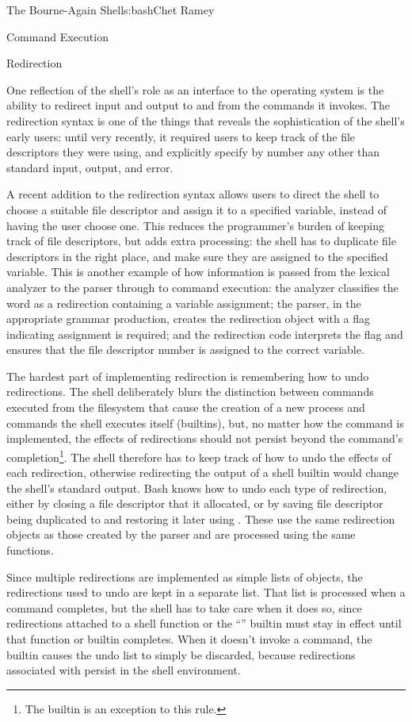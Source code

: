 \begin{aosachapter}{The Bourne-Again Shell}{s:bash}{Chet Ramey}
\begin{aosasect1}{Command Execution}
\begin{aosasect2}{Redirection}

One reflection of the shell's role as an interface to the operating
system is the ability to redirect input and output to and from the
commands it invokes.  The redirection syntax is one of the things that
reveals the sophistication of the shell's early users: until very
recently, it required users to keep track of the file descriptors they
were using, and explicitly specify by number any other than standard
input, output, and error.

A recent addition to the redirection syntax allows users to direct the
shell to choose a suitable file descriptor and assign it to a
specified variable, instead of having the user choose one.  This
reduces the programmer's burden of keeping track of file descriptors,
but adds extra processing: the shell has to duplicate file descriptors
in the right place, and make sure they are assigned to the specified
variable.  This is another example of how information is passed from
the lexical analyzer to the parser through to command execution: the
analyzer classifies the word as a redirection containing a variable
assignment; the parser, in the appropriate grammar production, creates
the redirection object with a flag indicating assignment is required;
and the redirection code interprets the flag and ensures that the file
descriptor number is assigned to the correct variable.

The hardest part of implementing redirection is remembering how to
undo redirections.  The shell deliberately blurs the distinction
between commands executed from the filesystem that cause the creation
of a new process and commands the shell executes itself (builtins),
but, no matter how the command is implemented, the effects of
redirections should not persist beyond the command's completion\footnote{The
 builtin is an exception to this rule.}. The shell therefore has
to keep track of how to undo the effects of each redirection,
otherwise redirecting the output of a shell builtin would change the
shell's standard output.  Bash knows how to undo each type of
redirection, either by closing a file descriptor that it allocated, or
by saving file descriptor being duplicated to and restoring it later
using .  These use the same redirection objects as those
created by the parser and are processed using the same functions.

Since multiple redirections are implemented as simple lists of
objects, the redirections used to undo are kept in a separate list.
That list is processed when a command completes, but the shell has to
take care when it does so, since redirections attached to a shell
function or the ``'' builtin must stay in effect until that
function or builtin completes.  When it doesn't invoke a command, the
 builtin causes the undo list to simply be discarded,
because redirections associated with  persist in the shell
environment.


\end{aosasect2}
\end{aosasect1}
\end{aosachapter}
